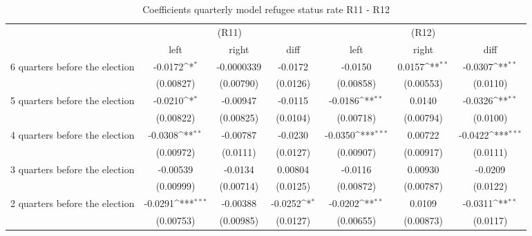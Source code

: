 \begin{table}[!ht]\centering \footnotesize
\def\sym#1{\ifmmode^{#1}\else\(^{#1}\)\fi}
\caption{Coefficients quarterly model refugee status rate R11 - R12}
\begin{tabular}{l*{6}{c}}
\hline\hline
                    &\multicolumn{3}{c}{(R11)}&\multicolumn{3}{c}{(R12)}\\
&\multicolumn{1}{c}{left}&\multicolumn{1}{c}{right}&\multicolumn{1}{c}{diff}&\multicolumn{1}{c}{left}&\multicolumn{1}{c}{right}&\multicolumn{1}{c}{diff}\\
\hline
 6 quarters before the election&     -0.0172\sym{*}  &  -0.0000339         &     -0.0172         &     -0.0150         &      0.0157\sym{**} &     -0.0307\sym{**} \\
                    &   (0.00827)         &   (0.00790)         &    (0.0126)         &   (0.00858)         &   (0.00553)         &    (0.0110)         \\
[0,5em]
 5 quarters before the election&     -0.0210\sym{*}  &    -0.00947         &     -0.0115         &     -0.0186\sym{**} &      0.0140         &     -0.0326\sym{**} \\
                    &   (0.00822)         &   (0.00825)         &    (0.0104)         &   (0.00718)         &   (0.00794)         &    (0.0100)         \\
[0,5em]
 4 quarters before the election&     -0.0308\sym{**} &    -0.00787         &     -0.0230         &     -0.0350\sym{***}&     0.00722         &     -0.0422\sym{***}\\
                    &   (0.00972)         &    (0.0111)         &    (0.0127)         &   (0.00907)         &   (0.00917)         &    (0.0111)         \\
[0,5em]
 3 quarters before the election&    -0.00539         &     -0.0134         &     0.00804         &     -0.0116         &     0.00930         &     -0.0209         \\
                    &   (0.00999)         &   (0.00714)         &    (0.0125)         &   (0.00872)         &   (0.00787)         &    (0.0122)         \\
[0,5em]
 2 quarters before the election&     -0.0291\sym{***}&    -0.00388         &     -0.0252\sym{*}  &     -0.0202\sym{**} &      0.0109         &     -0.0311\sym{**} \\
                    &   (0.00753)         &   (0.00985)         &    (0.0127)         &   (0.00655)         &   (0.00873)         &    (0.0117)         \\

\end{tabular}
\end{table}
